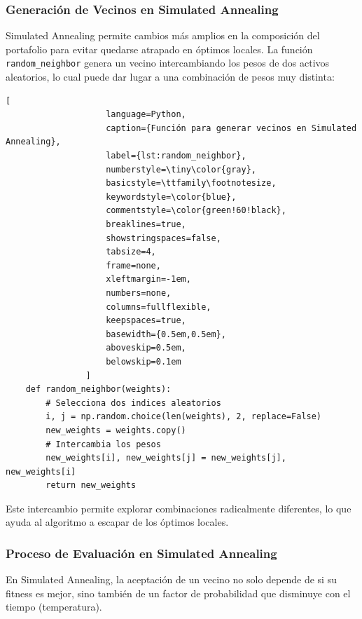 \documentclass[9pt,a4paper,twoside]{rho-class/rho}
\begin{document}
            \subsubsection{Generación de Vecinos en Simulated Annealing}
                Simulated Annealing permite cambios más amplios en la composición del portafolio para evitar quedarse atrapado en óptimos locales. La función \texttt{random\_neighbor} genera un vecino intercambiando los pesos de dos activos aleatorios, lo cual puede dar lugar a una combinación de pesos muy distinta:
                \begin{lstlisting}[
                    language=Python,
                    caption={Función para generar vecinos en Simulated Annealing},
                    label={lst:random_neighbor},
                    numberstyle=\tiny\color{gray},
                    basicstyle=\ttfamily\footnotesize,
                    keywordstyle=\color{blue},
                    commentstyle=\color{green!60!black},
                    breaklines=true,
                    showstringspaces=false,
                    tabsize=4,
                    frame=none,
                    xleftmargin=-1em,
                    numbers=none,
                    columns=fullflexible,
                    keepspaces=true,
                    basewidth={0.5em,0.5em},
                    aboveskip=0.5em,
                    belowskip=0.1em
                ]
    def random_neighbor(weights):
        # Selecciona dos indices aleatorios
        i, j = np.random.choice(len(weights), 2, replace=False)
        new_weights = weights.copy()
        # Intercambia los pesos
        new_weights[i], new_weights[j] = new_weights[j], new_weights[i]
        return new_weights
                \end{lstlisting}
                Este intercambio permite explorar combinaciones radicalmente diferentes, lo que ayuda al algoritmo a escapar de los óptimos locales.
            \subsubsection{Proceso de Evaluación en Simulated Annealing}
                En Simulated Annealing, la aceptación de un vecino no solo depende de si su fitness es mejor, sino también de un factor de probabilidad que disminuye con el tiempo (temperatura).
            
\end{document}
